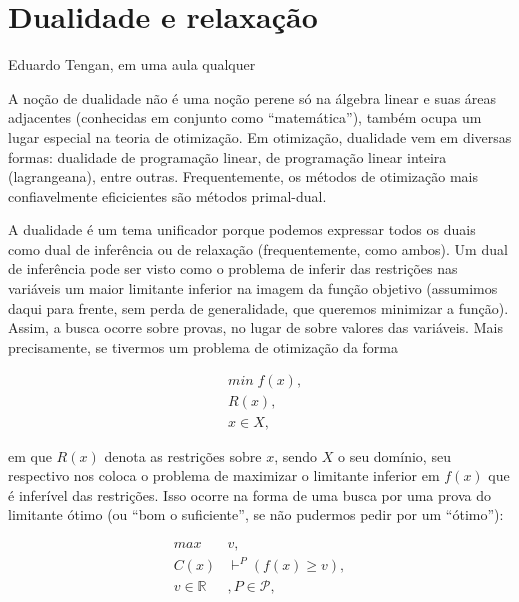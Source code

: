 \documentclass{article}
\begin{document}

\section{Dualidade e relaxação}

\epigraph{}{Eduardo Tengan, em uma aula qualquer}

A noção de dualidade não é uma noção perene só na álgebra linear e suas áreas adjacentes (conhecidas
em conjunto como ``matemática''), também ocupa um lugar especial na teoria de otimização. Em
otimização, dualidade vem em diversas formas: dualidade de programação linear, de programação
linear inteira (lagrangeana), entre outras. Frequentemente, os métodos de otimização mais
confiavelmente eficicientes são métodos primal-dual.

A dualidade é um tema unificador porque podemos expressar todos os duais como dual de inferência ou
de relaxação (frequentemente, como ambos). Um dual de inferência pode ser visto como o
problema de inferir das restrições nas variáveis um maior limitante inferior na imagem da função
objetivo (assumimos daqui para frente, sem perda de generalidade, que queremos minimizar a função). Assim, a busca ocorre
sobre provas, no lugar de sobre valores das variáveis. Mais precisamente, se tivermos um problema de
otimização da forma

\begin{align*}
  &  min \; f(x),\\
  &  R(x),\\
  &  x \in X,
\end{align*}

\noindent em que $R(x)$ denota as restrições sobre $x$, sendo $X$ o seu domínio, seu respectivo
 nos coloca o problema de maximizar o limitante inferior em $f(x)$ que
é inferível das restrições. Isso ocorre na forma de uma busca por uma prova do limitante ótimo (ou
``bom o suficiente'', se não pudermos pedir por um ``ótimo''):

\begin{align*}
  max \; & v,\\
  C(x) & \vdash^{P} (f(x) \geq v),\\
  v \in \mathbb{R}&, P \in \mathcal{P},
\end{align*}
\end{document}
